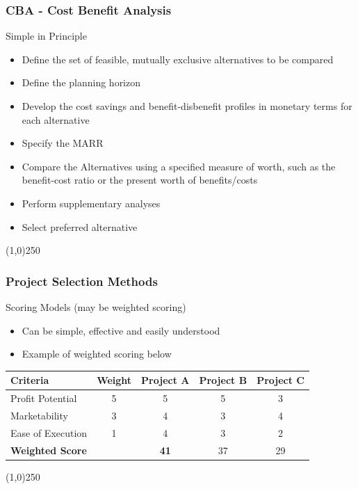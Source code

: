 \begin{frame}
\frametitle{CBA - Cost Benefit Analysis}
Simple in Principle\\
\begin{itemize}
	\item Define the set of feasible, mutually exclusive alternatives to be compared
	\item Define the planning horizon
	\item Develop the cost savings and benefit-disbenefit profiles in monetary terms for each alternative
	\item Specify the MARR
	\item Compare the Alternatives using a specified measure of worth, such as the benefit-cost ratio or the present worth of benefits/costs
	\item Perform supplementary analyses
	\item Select preferred alternative
\end{itemize}
\end{frame}\begin{center}\line(1,0){250}\end{center}
%
%


\begin{frame}
\frametitle{Project Selection Methods}
Scoring Models (may be weighted scoring)
\begin{itemize}
	\item Can be simple, effective and easily understood
	\item Example of weighted scoring below
\end{itemize}
\begin{table}[htb]
	\centering
		\begin{tabular}{|l|c|c|c|c|}
			\hline
			\textbf{Criteria}	&	\textbf{Weight}	&	\textbf{Project A}	&	\textbf{Project B}	&	\textbf{Project C}\\
			\hline
			Profit Potential	&	5	&	5	&	5	&	3\\
			Marketability		&	3	&	4	&	3	&	4\\
			Ease of Execution	&	1	&	4	&	3	&	2\\
			\hline
			\textbf{Weighted Score}	&		&	\textbf{41}	&	37	&	29\\
			\hline
		\end{tabular}
\end{table}
\end{frame}\begin{center}\line(1,0){250}\end{center}
%
%


